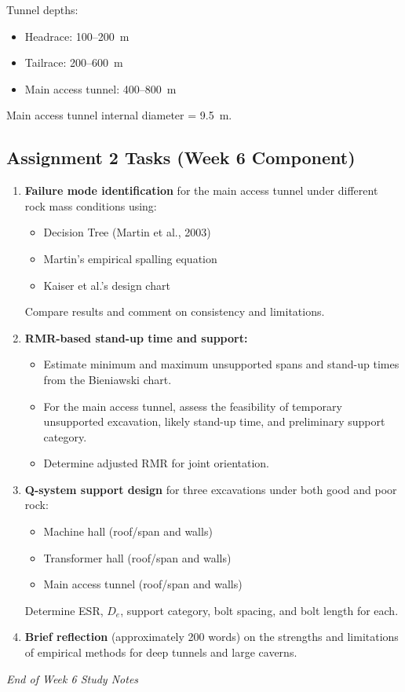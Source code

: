 \documentclass[a4paper,12pt]{article}
\begin{document}
Tunnel depths:
\begin{itemize}
    \item Headrace: 100--200~m
    \item Tailrace: 200--600~m
    \item Main access tunnel: 400--800~m
\end{itemize}

Main access tunnel internal diameter = 9.5~m.

\subsection{Assignment 2 Tasks (Week 6 Component)}
\begin{enumerate}
    \item \textbf{Failure mode identification} for the main access tunnel under different rock mass conditions using:
    \begin{itemize}
        \item Decision Tree (Martin et al., 2003)
        \item Martin's empirical spalling equation
        \item Kaiser et al.'s design chart
    \end{itemize}
    Compare results and comment on consistency and limitations.

    \item \textbf{RMR-based stand-up time and support:}
    \begin{itemize}
        \item Estimate minimum and maximum unsupported spans and stand-up times from the Bieniawski chart.
        \item For the main access tunnel, assess the feasibility of temporary unsupported excavation, likely stand-up time, and preliminary support category.
        \item Determine adjusted RMR for joint orientation.
    \end{itemize}

    \item \textbf{Q-system support design} for three excavations under both good and poor rock:
    \begin{itemize}
        \item Machine hall (roof/span and walls)
        \item Transformer hall (roof/span and walls)
        \item Main access tunnel (roof/span and walls)
    \end{itemize}
    Determine ESR, $D_e$, support category, bolt spacing, and bolt length for each.

    \item \textbf{Brief reflection} (approximately 200 words) on the strengths and limitations of empirical methods for deep tunnels and large caverns.
\end{enumerate}

\vspace{1cm}
\noindent\textit{End of Week 6 Study Notes}
\end{document}
